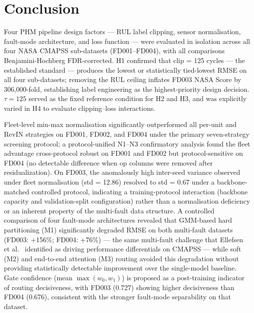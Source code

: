 \documentclass[preprint,10pt]{elsarticle}
\begin{document}
\section{Conclusion}

Four PHM pipeline design factors — RUL label clipping, sensor normalisation, fault-mode architecture, and loss function — were evaluated in isolation across all four NASA CMAPSS sub-datasets (FD001–FD004), with all comparisons Benjamini-Hochberg FDR-corrected. H1 confirmed that clip = 125 cycles — the established standard \cite{ref05,ref06} — produces the lowest or statistically tied-lowest RMSE on all four sub-datasets; removing the RUL ceiling inflates FD003 NASA Score by 306,000-fold, establishing label engineering as the highest-priority design decision. $\tau = 125$ served as the fixed reference condition for H2 and H3, and was explicitly varied in H4 to evaluate clipping--loss interactions.

Fleet-level min-max normalisation significantly outperformed all per-unit and RevIN strategies on FD001, FD002, and FD004 under the primary seven-strategy screening protocol; a protocol-unified N1--N3 confirmatory analysis found the fleet advantage cross-protocol robust on FD001 and FD002 but protocol-sensitive on FD004 (no detectable difference when op columns were removed after residualization). On FD003, the anomalously high inter-seed variance observed under fleet normalisation (std = 12.86) resolved to std = 0.67 under a backbone-matched controlled protocol, indicating a training-protocol interaction (backbone capacity and validation-split configuration) rather than a normalisation deficiency or an inherent property of the multi-fault data structure. A controlled comparison of four fault-mode architectures revealed that GMM-based hard partitioning (M1) significantly degraded RMSE on both multi-fault datasets (FD003: +156\%; FD004: +76\%) --- the same multi-fault challenge that Ellefsen et al.~\cite{ref07} identified as driving performance differentials on CMAPSS --- while soft (M2) and end-to-end attention (M3) routing avoided this degradation without providing statistically detectable improvement over the single-model baseline. Gate confidence (mean $\max(w_0, w_1)$) is proposed as a post-training indicator of routing decisiveness, with FD003 (0.727) showing higher decisiveness than FD004 (0.676), consistent with the stronger fault-mode separability on that dataset.
\end{document}
